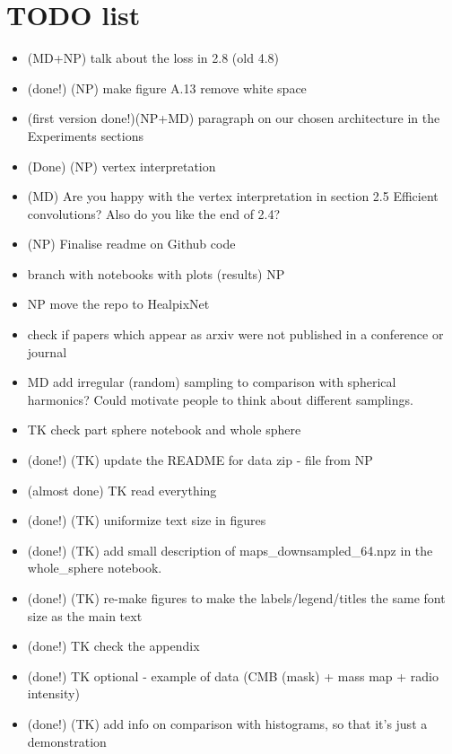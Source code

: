 \documentclass[final,twocolumn,3p,times,authoryear]{elsarticle}
\newcommand{\nati}[1]{{\color[rgb]{.1,.6,.1}{#1}}}
\newcommand{\1}{\b{1}}              %
\newcommand{\0}{\b{0}}              %
\begin{document}
\section*{TODO list}
\begin{itemize}[noitemsep,topsep=0pt,parsep=0pt,partopsep=0pt]

    \item (MD+NP) talk about the loss in 2.8 (old 4.8) \nati{I was very brief. In color for now.}
    \item (done!) (NP) make figure A.13 remove white space
    \item (first version done!)(NP+MD) paragraph on our chosen architecture in the Experiments sections
    \item (Done) (NP) vertex interpretation 
    \item (MD) Are you happy with the vertex interpretation in section 2.5 Efficient convolutions? Also do you like the end of 2.4?
    \item (NP) Finalise readme on Github code
    \item branch with notebooks with plots (results) NP
    \item NP move the repo to HealpixNet
    \item check if papers which appear as arxiv were not published in a conference or journal
    \item MD add irregular (random) sampling to comparison with spherical harmonics? Could motivate people to think about different samplings. \nati{I think this is too much for this paper.}
    \item TK check part sphere notebook and whole sphere
    \item (done!) (TK) update the README for data zip - file from NP
    \item (almost done) TK read everything
    \item (done!) (TK) uniformize text size in figures
    \item (done!) (TK) add small description of maps\_downsampled\_64.npz in the whole\_sphere notebook. \nati{We need to talk about that.}
    \item (done!) (TK) re-make figures to make the labels/legend/titles the same font size as the main text
    \item (done!) TK check the appendix
    \item (done!) TK optional - example of data (CMB (mask) + mass map + radio intensity)
    \item (done!) (TK) add info on comparison with histograms, so that it's just a demonstration

\end{itemize}
\end{document}
